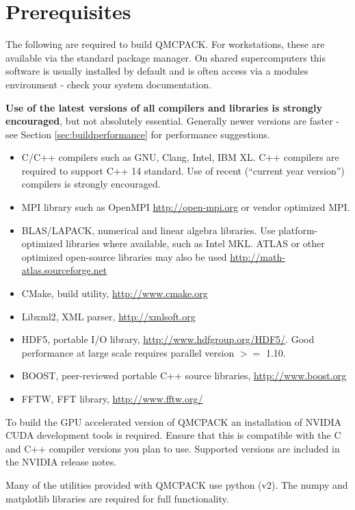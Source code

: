 \section{Prerequisites}
\label{sec:prerequisites}
The following are required to build QMCPACK. For workstations, these are available via the standard
package manager. On shared supercomputers this software is usually
installed by default and is often
access via a modules environment - check your system
documentation.

\textbf{Use of the latest versions of all compilers and libraries is
strongly encouraged}, but not absolutely essential. Generally newer versions are faster - see
Section \ref{sec:buildperformance} for performance suggestions.

\begin{itemize}
\item C/C++ compilers such as GNU, Clang, Intel, IBM XL. C++ compilers
  are required to support C++ 14 standard. Use of recent (``current
  year version'') compilers is strongly encouraged.
\item MPI library such as OpenMPI \url{http://open-mpi.org} or vendor
  optimized MPI.
\item BLAS/LAPACK, numerical and linear algebra libraries. Use
  platform-optimized libraries where available, such as Intel MKL.
  ATLAS or other optimized open-source libraries may also be used
  \url{http://math-atlas.sourceforge.net}
\item CMake, build utility, \url{http://www.cmake.org}
\item Libxml2, XML parser, \url{http://xmlsoft.org}
\item HDF5, portable I/O library, \url{http://www.hdfgroup.org/HDF5/}. Good performance at large scale requires parallel version $>=$ 1.10.
\item BOOST, peer-reviewed portable C++ source libraries, \url{http://www.boost.org}
\item FFTW, FFT library, \url{http://www.fftw.org/}
\end{itemize}

To build the GPU accelerated version of QMCPACK an installation of
NVIDIA CUDA development tools is required. Ensure that this is
compatible with the C and C++ compiler versions you plan to
use. Supported versions are included in the NVIDIA release notes.

Many of the utilities provided with QMCPACK use python (v2). The numpy
and matplotlib libraries are required for full functionality.

